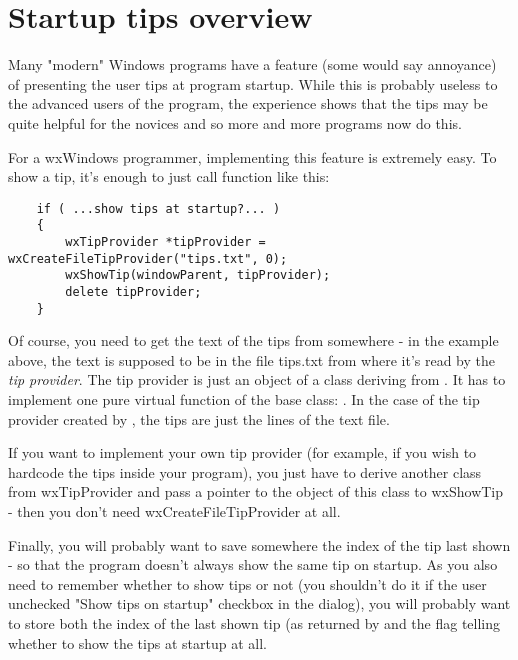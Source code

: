 \section{Startup tips overview}\label{tipsoverview}

Many "modern" Windows programs have a feature (some would say annoyance) of
presenting the user tips at program startup. While this is probably useless to
the advanced users of the program, the experience shows that the tips may be
quite helpful for the novices and so more and more programs now do this.

For a wxWindows programmer, implementing this feature is extremely easy. To
show a tip, it's enough to just call  function
like this:

\begin{verbatim}
    if ( ...show tips at startup?... )
    {
        wxTipProvider *tipProvider = wxCreateFileTipProvider("tips.txt", 0);
        wxShowTip(windowParent, tipProvider);
        delete tipProvider;
    }
\end{verbatim}

Of course, you need to get the text of the tips from somewhere - in the example
above, the text is supposed to be in the file tips.txt from where it's read by
the {\it tip provider}. The tip provider is just an object of a class deriving
from . It has to implement one pure
virtual function of the base class: .
In the case of the tip provider created by 
, the tips are just
the lines of the text file.

If you want to implement your own tip provider (for example, if you wish to
hardcode the tips inside your program), you just have to derive another class
from wxTipProvider and pass a pointer to the object of this class to wxShowTip
- then you don't need wxCreateFileTipProvider at all.

Finally, you will probably want to save somewhere the index of the tip last
shown - so that the program doesn't always show the same tip on startup. As you
also need to remember whether to show tips or not (you shouldn't do it if the
user unchecked "Show tips on startup" checkbox in the dialog), you will
probably want to store both the index of the
last shown tip (as returned by 
 and the flag
telling whether to show the tips at startup at all.

